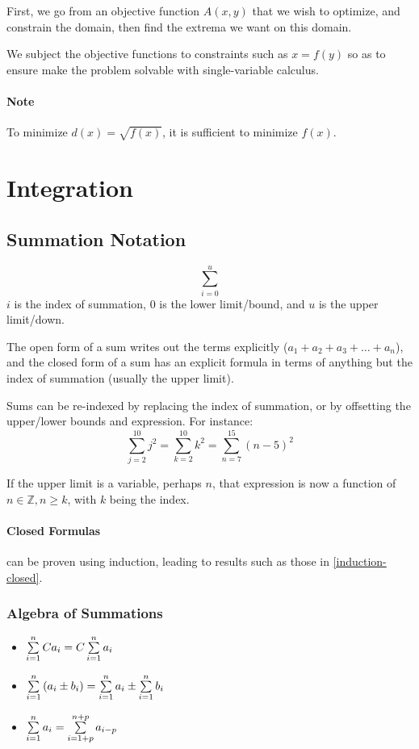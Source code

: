 \documentclass{article}
\begin{document}
First, we go from an objective function $A(x,y)$ that we wish to optimize, and constrain the domain, then find the extrema we want on this domain.

We subject the objective functions to constraints such as $x = f(y)$ so as to ensure make the problem solvable with single-variable calculus.

\paragraph{Note} To minimize $d(x) = \sqrt{f(x)}$, it is sufficient to minimize $f(x)$.

\section{Integration}
\subsection{Summation Notation}
$$\sum_{i=0}^{u}$$
$i$ is the index of summation, $0$ is the lower limit/bound, and $u$ is the upper limit/down.

The open form of a sum writes out the terms explicitly ($a_1 + a_2 + a_3 + \ldots + a_n$), and the closed form of a sum has an explicit formula in terms of anything but the index of summation (usually the upper limit).

Sums can be re-indexed by replacing the index of summation, or by offsetting the upper/lower bounds and expression. For instance:
$$\sum_{j=2}^{10} j^2 = \sum_{k=2}^{10} k^2 = \sum_{n=7}^{15} (n-5)^2$$

If the upper limit is a variable, perhaps $n$, that expression is now a function of $n \in \mathbb{Z}, n \ge k$, with $k$ being the index.

\paragraph{Closed Formulas}can be proven using induction, leading to results such as those in \ref{induction-closed}.

\subsubsection{Algebra of Summations}
\begin{itemize}
    \item $\sum_{i=1}^{n}\limits Ca_i = C\sum_{i=1}^{n}\limits a_i$
    \item $\sum_{i=1}^{n}\limits \left(a_i \pm b_i\right) = \sum_{i=1}^{n}\limits a_i \pm \sum_{i=1}^{n}\limits b_i$
    \item $\sum_{i=1}^{n}\limits a_i = \sum_{i=1+p}^{n+p}\limits a_{i-p}$
\end{itemize}
\end{document}
